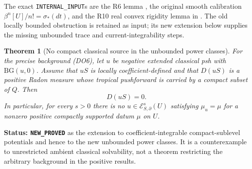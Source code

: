 \documentclass[11pt,a4paper]{article}
\numberwithin{equation}{section}
\newtheorem{theorem}{Theorem}[section]
\theoremstyle{definition}
\theoremstyle{remark}
\begin{document}
The exact \texttt{INTERNAL\_INPUT}s are the R6 lemma
, the original smooth
calibration $\beta^n[U]/n!=\sigma_*(dt)$, and the R10 real
convex rigidity lemma
 in
.
The old locally bounded obstruction is retained as input; its
new extension below supplies the missing unbounded trace and
current-integrability steps.

\begin{theorem}[No compact classical source in the unbounded power classes]
\label{thm:r11-power-compact-source-obstruction}
For the precise background (DO6), let $u$ be negative extended
classical psh with $\mathrm{BG}(u,0)$. Assume that $uS$ is
locally coefficient-defined and that $D(uS)$ is a positive
Radon measure whose tropical pushforward is carried by a compact
subset of $Q$. Then
\[
                             D(uS)=0.
 \tag{DO7}
\]
In particular, for every $s>0$ there is no
$u\in\mathcal E^s_{S,\partial}(U)$ satisfying
$\mu_u=\mu$ for a nonzero positive compactly supported datum
$\mu$ on $U$.
\end{theorem}

\noindent\textbf{Status: \texttt{NEW\_PROVED}} as the extension
to coefficient-integrable compact-sublevel potentials and hence
to the new unbounded power classes. It is a counterexample to
unrestricted ambient classical solvability, not a theorem
restricting the arbitrary background in the positive results.
\end{document}
